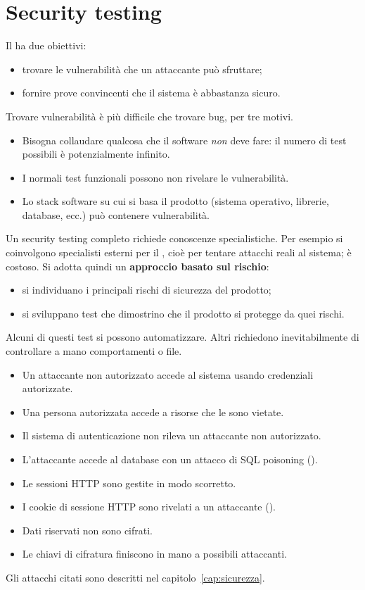 \section{Security testing}
\label{sec:test-sicurezza}

Il  ha due obiettivi:
\begin{itemize}
  \item trovare le vulnerabilità che un attaccante può sfruttare;
  \item fornire prove convincenti che il sistema è abbastanza sicuro.
\end{itemize}

Trovare vulnerabilità è più difficile che trovare bug, per tre motivi.
\begin{itemize}
  \item Bisogna collaudare qualcosa che il software \emph{non} deve fare: il numero di test possibili è potenzialmente
    infinito.
  \item I normali test funzionali possono non rivelare le vulnerabilità.
  \item Lo stack software su cui si basa il prodotto (sistema operativo, librerie, database, ecc.) può contenere
    vulnerabilità.
\end{itemize}

Un security testing completo richiede conoscenze specialistiche. Per esempio si coinvolgono specialisti esterni per il
, cioè per tentare attacchi reali al sistema; è costoso. Si adotta quindi un
\textbf{approccio basato sul rischio}:
\begin{itemize}
  \item si individuano i principali rischi di sicurezza del prodotto;
  \item si sviluppano test che dimostrino che il prodotto si protegge da quei rischi.
\end{itemize}
Alcuni di questi test si possono automatizzare. Altri richiedono inevitabilmente di controllare a mano comportamenti o
file.

\begin{esempio}
\begin{itemize}
  \item Un attaccante non autorizzato accede al sistema usando credenziali autorizzate.
  \item Una persona autorizzata accede a risorse che le sono vietate.
  \item Il sistema di autenticazione non rileva un attaccante non autorizzato.
  \item L'attaccante accede al database con un attacco di SQL poisoning ().
  \item Le sessioni HTTP sono gestite in modo scorretto.
  \item I cookie di sessione HTTP sono rivelati a un attaccante ().
  \item Dati riservati non sono cifrati.
  \item Le chiavi di cifratura finiscono in mano a possibili attaccanti.
\end{itemize}
Gli attacchi citati sono descritti nel capitolo~\ref{cap:sicurezza}.
\end{esempio}

